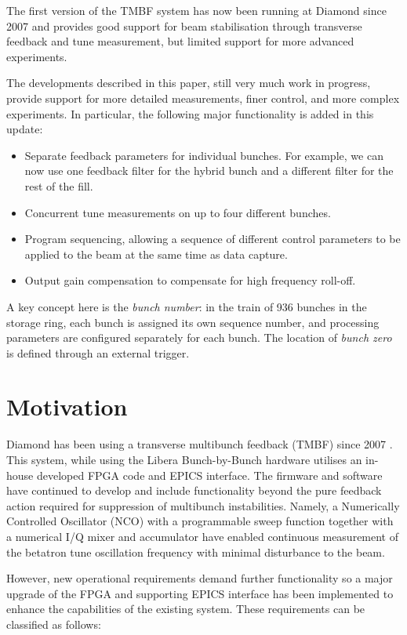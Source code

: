 \documentclass{JAC2003}
\begin{document}
The first version of the TMBF system has now been running at Diamond since 2007
and provides good support for beam stabilisation through transverse feedback and
tune measurement, but limited support for more advanced experiments.

The developments described in this paper, still very much work in progress,
provide support for more detailed measurements, finer control, and more complex
experiments.  In particular, the following major functionality is added in this
update:

\begin{itemize}
\item
    Separate feedback parameters for individual bunches.  For example, we can
now use one feedback filter for the hybrid bunch and a different filter for the
rest of the fill.
\item
    Concurrent tune measurements on up to four different bunches.
\item
    Program sequencing, allowing a sequence of different control parameters to
be applied to the beam at the same time as data capture.
\item
    Output gain compensation to compensate for high frequency roll-off.
\end{itemize}

A key concept here is the \emph{bunch number}: in the train of 936 bunches in
the storage ring, each bunch is assigned its own sequence number, and processing
parameters are configured separately for each bunch.  The location of
\emph{bunch zero} is defined through an external trigger.


\section{Motivation}

Diamond has been using a transverse multibunch feedback (TMBF) since 2007
\cite{early-tmbf, performance}.  This system, while using the Libera
Bunch-by-Bunch hardware utilises an in-house developed FPGA code and EPICS
interface.  The firmware and software have continued to develop and include
functionality beyond the pure feedback action required for suppression of
multibunch instabilities.  Namely, a Numerically Controlled Oscillator (NCO)
with a programmable sweep function together with a numerical I/Q mixer and
accumulator have enabled continuous measurement of the betatron tune oscillation
frequency \cite{status} with minimal disturbance to the beam.

However, new operational requirements demand further functionality so a major
upgrade of the FPGA and supporting EPICS interface has been implemented to
enhance the capabilities of the existing system.  These requirements can be
classified as follows:
\end{document}

